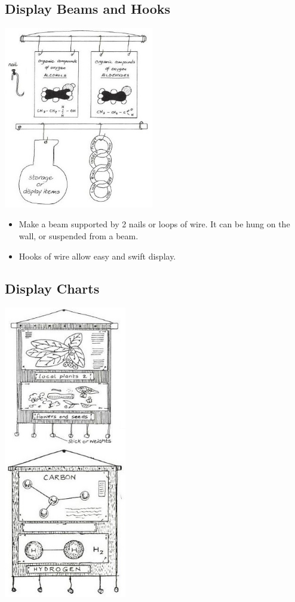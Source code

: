 \begin{multicols}{2}
\subsection{Display Beams and Hooks}

\begin{center}
\includegraphics[width=0.49\textwidth]{./img/vso/display-beams-hooks.jpg}
\end{center}

\begin{itemize}
\item Make a beam supported by 2 nails or loops of wire.
It can be hung on the wall, or suspended from a beam.
\item Hooks of wire allow easy and swift display.
\end{itemize}

\subsection{Display Charts}

\begin{center}
\includegraphics[width=0.4\textwidth]{./img/vso/display-charts-alt.jpg}
\end{center}


\end{multicols}
